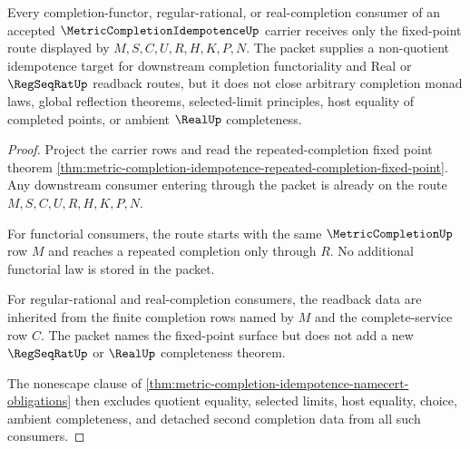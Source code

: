 \begin{theorem}
\label{thm:metric-completion-idempotence-downstream-scope}
Every completion-functor, regular-rational, or real-completion consumer of an accepted $\MetricCompletionIdempotenceUp$ carrier receives only the fixed-point route displayed by $M,S,C,U,R,H,K,P,N$. The packet supplies a non-quotient idempotence target for downstream completion functoriality and Real or $\RegSeqRatUp$ readback routes, but it does not close arbitrary completion monad laws, global reflection theorems, selected-limit principles, host equality of completed points, or ambient $\RealUp$ completeness.
\end{theorem}
\begin{proof}
Project the carrier rows and read the repeated-completion fixed point theorem \autoref{thm:metric-completion-idempotence-repeated-completion-fixed-point}. Any downstream consumer entering through the packet is already on the route $M,S,C,U,R,H,K,P,N$.

For functorial consumers, the route starts with the same $\MetricCompletionUp$ row $M$ and reaches a repeated completion only through $R$. No additional functorial law is stored in the packet.

For regular-rational and real-completion consumers, the readback data are inherited from the finite completion rows named by $M$ and the complete-service row $C$. The packet names the fixed-point surface but does not add a new $\RegSeqRatUp$ or $\RealUp$ completeness theorem.

The nonescape clause of \autoref{thm:metric-completion-idempotence-namecert-obligations} then excludes quotient equality, selected limits, host equality, choice, ambient completeness, and detached second completion data from all such consumers.
\end{proof}


